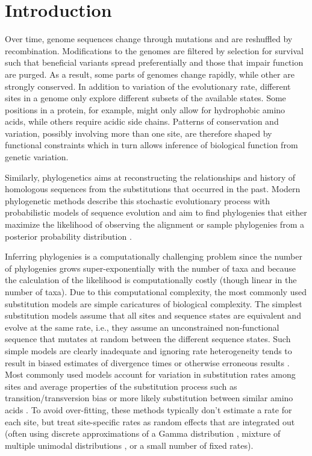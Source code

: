 \documentclass[aps,rmp,twocolumn,linenumbers]{revtex4-1}
\begin{document}
\section*{Introduction}
Over time, genome sequences change through mutations and are reshuffled by recombination.
Modifications to the genomes are filtered by selection for survival such that beneficial variants spread preferentially and those that impair function are purged.
As a result, some parts of genomes change rapidly, while other are strongly conserved.
In addition to variation of the evolutionary rate, different sites in a genome only explore different subsets of the available states.
Some positions in a protein, for example, might only allow for hydrophobic amino acids, while others require acidic side chains.
Patterns of conservation and variation, possibly involving more than one site, are therefore shaped by functional constraints which in turn allows inference of biological function from genetic variation.

Similarly, phylogenetics aims at reconstructing the relationships and history of homologous sequences from the substitutions that occurred in the past.
Modern phylogenetic methods describe this stochastic evolutionary process with probabilistic models of sequence evolution and aim to find phylogenies that either maximize the likelihood of observing the alignment or sample phylogenies from a posterior probability distribution \citep{felsenstein2004inferring}.

Inferring phylogenies is a computationally challenging problem since the number of phylogenies grows super-exponentially with the number of taxa and because the calculation of the likelihood is computationally costly (though linear in the number of taxa).
Due to this computational complexity, the most commonly used substitution models are simple caricatures of biological complexity.
The simplest substitution models assume that all sites and sequence states are equivalent and evolve at the same rate, i.e., they assume an unconstrained non-functional sequence that mutates at random between the different sequence states.
Such simple models are clearly inadequate and ignoring rate heterogeneity tends to result in biased estimates of divergence times or otherwise erroneous results \citep{yang1996among}.
Most commonly used models account for variation in substitution rates among sites and average properties of the substitution process such as transition/transversion bias or more likely substitution between similar amino acids \citep{yang_maximum_1994,FastTree2,nguyen_iq-tree:_2015,stamatakis_raxml_2014}.
To avoid over-fitting, these methods typically don't estimate a rate for each site, but treat site-specific rates as random effects that are integrated out (often using discrete approximations of a Gamma distribution \citep{yang1996among}, mixture of multiple unimodal distributions \citep{mayrose2005gamma}, or a small number of fixed rates).
\end{document}
